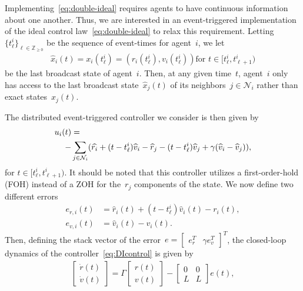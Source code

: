 \documentclass{autart}
\newcommand{\integernonnegative}{\mathbb{Z}_{\ge 0}}
\newcommand{\NN}{{\mathcal{N}}}
\renewcommand{\hat}{\widehat}
\begin{document}
Implementing~\eqref{eq:double-ideal} requires agents to have
continuous information about one another. Thus, we are interested in
an event-triggered implementation of the ideal control
law~\eqref{eq:double-ideal} to relax this
requirement. Letting~$\{t_\ell^i\}_{\ell \in \integernonnegative}$ be
the sequence of event-times for agent~$i$, we let
\begin{align}\label{eq:xhatDI}
  \hat{x}_i(t) = x_i(t_\ell^i) = (r_i(t_\ell^i),v_i(t_\ell^i)) \text{
  for } t \in [t_\ell^i,t_{\ell+1}^i) 
\end{align}
be the last broadcast state of agent~$i$. Then, at any given time~$t$,
agent~$i$ only has access to the last broadcast state~$\hat{x}_j(t)$
of its neighbors~$j \in \NN_i$ rather than exact states~$x_j(t)$.

The distributed event-triggered controller we consider is then given by
\begin{align}\label{eq:DIcontrol}
  u_i(t) &= 
  \\
  -& \sum_{j \in \NN_i} (\hat{r_i} + (t-t_\ell^i) \hat{v}_i - \hat{r}_j
     - (t-t_\ell^i) \hat{v}_j + \gamma(\hat{v}_i - \hat{v}_j)) \notag, 
\end{align}
for $t \in [t_\ell^i, t_{\ell+1}^i)$. It should be noted that this
controller utilizes a first-order-hold (FOH) instead of a ZOH for
the~$r_j$ components of the state. We now define two different errors
\begin{align*}
  e_{r,i}(t) &= \hat{r}_i(t) + (t-t_\ell^i)\hat{v}_i(t) - r_i(t), 
  \\
  e_{v,i}(t) &= \hat{v}_i(t) - v_i(t).
\end{align*}
Then, defining the stack vector of the
error~$e = \left[ \begin{array}{cc} e_r^T & \gamma e_v^T \end{array}
\right]^T$,
the closed-loop dynamics of the controller~\eqref{eq:DIcontrol} is
given by
\begin{align}\label{eq:DI-closed}
  \left[ \begin{array}{c} \dot{r}(t) \\ \dot{v}(t) \end{array} \right] %
  = \Gamma \left[ \begin{array}{c} r(t) \\ v(t) \end{array} \right] - \left[ \begin{array}{cc} 0 & 0 \\ L & L \end{array} \right] e(t),
\end{align}
\end{document}
